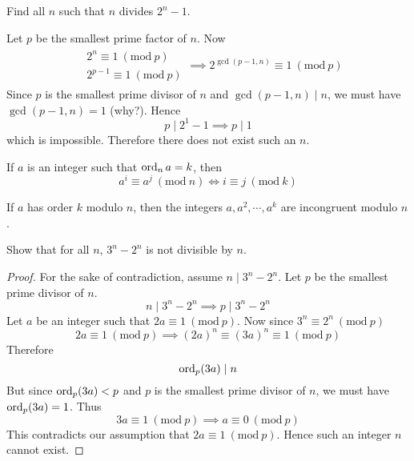 \documentclass[11pt,numbers=noenddot,svgnames,dvipsnames]{scrartcl}
\renewcommand{\pmod}[1]{\ (\mathrm{mod}\ #1)}
\begin{document}
\begin{example}
    Find all $n$ such that $n$ divides $2^{n} - 1$.
\end{example}
\begin{sol}
    Let $p$ be the smallest prime factor of $n$. Now 
    \begin{align*}
        \begin{matrix}
            & 2^n     \equiv 1 \pmod p \\
            & 2^{p-1} \equiv 1 \pmod p
        \end{matrix} \implies 2^{\gcd(p - 1, n)} \equiv 1 \pmod p
    \end{align*}
    Since $p$ is the smallest prime divisor of $n$ and $\gcd(p - 1, n) \mid n$, 
    we must have $\gcd(p - 1, n) = 1$ (why?). Hence 
    \[
        p \mid 2^1 - 1 \implies p \mid 1
    \]
    which is impossible. Therefore there does not exist such an $n$.
\end{sol}

\begin{theorem}
    If $a$ is an integer such that $\operatorname{ord}_{n} a = k$, then 
    \[
        a^{i} \equiv a^{j} \pmod n \iff i \equiv j \pmod k
    \]
\end{theorem}

\begin{corollary}
    If $a$ has order $k$ modulo $n$, then the integers $a, a^{2}, \cdots, a^{k}$ 
    are incongruent modulo $n$.
\end{corollary}

\begin{example}
    Show that for all $n$, $3^{n} - 2^{n}$ is not divisible by $n$.
\end{example}
\begin{proof}
    For the sake of contradiction, assume $n\mid 3^{n} - 2^{n}$. Let $p$ be the smallest 
    prime divisor of $n$. 
    \[
        n \mid 3^{n} - 2^{n} \implies p \mid 3^{n} - 2^{n}
    \]
    Let $a$ be an integer such that $2a \equiv 1 \pmod p$. Now since $3^{n} \equiv 2^{n} \pmod p$ 
    \[
        2a \equiv 1 \pmod p \implies (2a)^{n} \equiv (3a)^{n} \equiv 1 \pmod p
    \]
    Therefore 
    \[
        \operatorname{ord}_{p}(3a) \mid n
    \]
    But since $\operatorname{ord}_{p}(3a) < p$ and $p$ is the smallest prime divisor of $n$, we must have 
    $\operatorname{ord}_{p}(3a) = 1$. Thus 
    \[
        3a \equiv 1 \pmod p \implies a \equiv 0 \pmod p
    \]
    This contradicts our assumption that $2a \equiv 1 \pmod p$. Hence such an integer $n$ cannot exist.
\end{proof}
\end{document}
